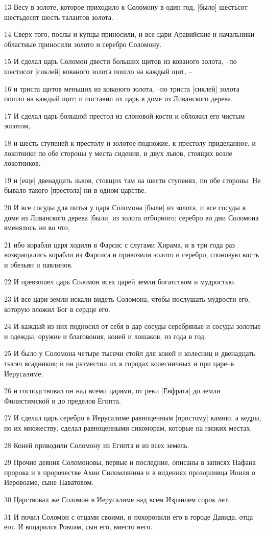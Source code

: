 \par 13 Весу в золоте, которое приходило к Соломону в один год, [было] шестьсот шестьдесят шесть талантов золота.
\par 14 Сверх того, послы и купцы приносили, и все цари Аравийские и начальники областные приносили золото и серебро Соломону.
\par 15 И сделал царь Соломон двести больших щитов из кованого золота, --по шестисот [сиклей] кованого золота пошло на каждый щит, --
\par 16 и триста щитов меньших из кованого золота, --по триста [сиклей] золота пошло на каждый щит; и поставил их царь в доме из Ливанского дерева.
\par 17 И сделал царь большой престол из слоновой кости и обложил его чистым золотом,
\par 18 и шесть ступеней к престолу и золотое подножие, к престолу приделанное, и локотники по обе стороны у места сидения, и двух львов, стоящих возле локотников,
\par 19 и [еще] двенадцать львов, стоящих там на шести ступенях, по обе стороны. Не бывало такого [престола] ни в одном царстве.
\par 20 И все сосуды для питья у царя Соломона [были] из золота, и все сосуды в доме из Ливанского дерева [были] из золота отборного; серебро во дни Соломона вменялось ни во что,
\par 21 ибо корабли царя ходили в Фарсис с слугами Хирама, и в три года раз возвращались корабли из Фарсиса и привозили золото и серебро, слоновую кость и обезьян и павлинов.
\par 22 И превзошел царь Соломон всех царей земли богатством и мудростью.
\par 23 И все цари земли искали видеть Соломона, чтобы послушать мудрости его, которую вложил Бог в сердце его.
\par 24 И каждый из них подносил от себя в дар сосуды серебряные и сосуды золотые и одежды, оружие и благовония, коней и лошаков, из года в год.
\par 25 И было у Соломона четыре тысячи стойл для коней и колесниц и двенадцать тысяч всадников; и он разместил их в городах колесничных и при царе--в Иерусалиме;
\par 26 и господствовал он над всеми царями, от реки [Евфрата] до земли Филистимской и до пределов Египта.
\par 27 И сделал царь серебро в Иерусалиме равноценным [простому] камню, а кедры, по их множеству, сделал равноценными сикоморам, которые на низких местах.
\par 28 Коней приводили Соломону из Египта и из всех земель.
\par 29 Прочие деяния Соломоновы, первые и последние, описаны в записях Нафана пророка и в пророчестве Ахии Силомлянина и в видениях прозорливца Иоиля о Иеровоаме, сыне Наватовом.
\par 30 Царствовал же Соломон в Иерусалиме над всем Израилем сорок лет.
\par 31 И почил Соломон с отцами своими, и похоронили его в городе Давида, отца его. И воцарился Ровоам, сын его, вместо него.

